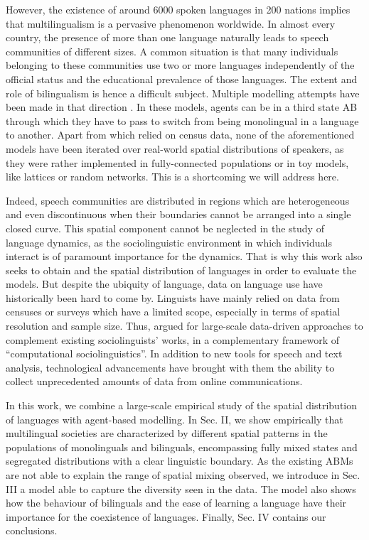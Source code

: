 \documentclass[../thesis.tex]{subfiles}
\begin{document}
However, the existence of around \SI{6000}{} spoken languages in 200 nations implies
that multilingualism is a pervasive phenomenon worldwide. In almost every country, the
presence of more than one language naturally leads to speech communities of different
sizes. A common situation is that many individuals belonging to these communities use
two or more languages independently of the official status and the educational
prevalence of those languages. The extent and role of bilingualism is hence a difficult
subject. Multiple modelling attempts have been made in that direction
\cite{CastelloOrderingDynamics2006,PatriarcaInfluenceGeography2009,PatriarcaModelingTwolanguage2012,VazquezAgentBased2010}.
In these models, agents can be in a third state AB through which they have to pass to
switch from being monolingual in a language to another. Apart from
\cite{ProchazkaQuantifyingDriving2017} which relied on census data, none of the
aforementioned models have been iterated over real-world spatial distributions of
speakers, as they were rather implemented in fully-connected populations or in toy
models, like lattices or random networks. This is a shortcoming we will address here.

Indeed, speech communities are distributed in regions which are heterogeneous and even
discontinuous when their boundaries cannot be arranged into a single closed curve. This
spatial component cannot be neglected in the study of language dynamics, as the
sociolinguistic environment in which individuals interact is of paramount importance for
the dynamics. That is why this work also seeks to obtain and the spatial distribution of
languages in order to evaluate the models. But despite the ubiquity of language, data on
language use have historically been hard to come by. Linguists have mainly relied on
data from censuses or surveys which have a limited scope, especially in terms of spatial
resolution and sample size. Thus, \cite{NguyenComputationalSociolinguistics2016} argued
for large-scale data-driven approaches to complement existing sociolinguists' works, in
a complementary framework of ``computational sociolinguistics''. In addition to new
tools for speech and text analysis, technological advancements have brought with them
the ability to collect unprecedented amounts of data from online communications.

In this work, we combine a large-scale empirical study of the spatial distribution of
languages with agent-based modelling. In Sec. II, we show empirically that multilingual
societies are characterized by different spatial patterns in the populations of
monolinguals and bilinguals, encompassing fully mixed states and segregated
distributions with a clear linguistic boundary. As the existing ABMs are not able to
explain the range of spatial mixing observed, we introduce in Sec. III a model able to
capture the diversity seen in the data. The model also shows how the behaviour of
bilinguals and the ease of learning a language have their importance for the coexistence
of languages. Finally, Sec. IV contains our conclusions.
\end{document}
